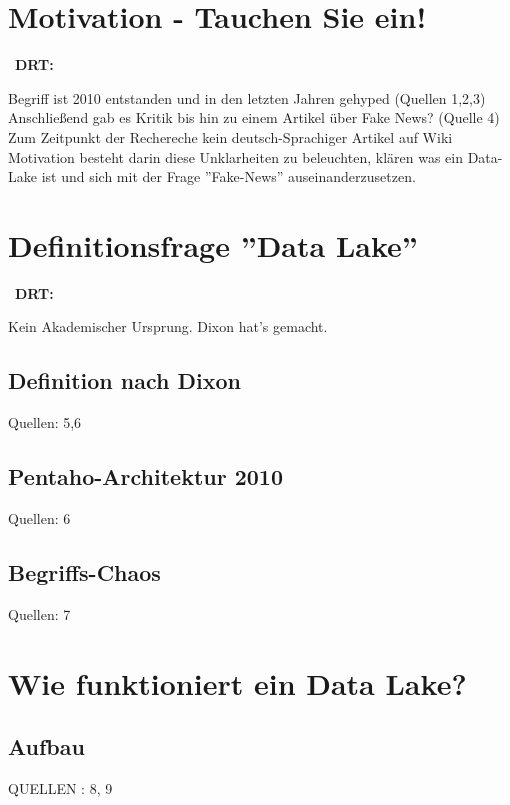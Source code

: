 \documentclass[
10pt, %
a4paper, %
oneside, %
headinclude,footinclude, %
BCOR5mm, %
]{scrartcl}
\begin{document}

\newpage %

\section{Motivation - Tauchen Sie ein!}\
\textbf{DRT:}

Begriff ist 2010 entstanden und in den letzten Jahren gehyped (Quellen 1,2,3)\\
Anschließend gab es Kritik bis hin zu einem Artikel über Fake News? (Quelle 4)\\
Zum Zeitpunkt der Rechereche kein deutsch-Sprachiger Artikel auf Wiki\\
Motivation besteht darin diese Unklarheiten zu beleuchten, klären was ein Data-Lake ist und sich mit der Frage ''Fake-News'' auseinanderzusetzen.


\section{Definitionsfrage ''Data Lake''}\
\textbf{DRT:}

Kein Akademischer Ursprung. Dixon hat's gemacht.
\subsection{Definition nach Dixon}
Quellen: 5,6
\subsection{Pentaho-Architektur 2010}
Quellen: 6
\subsection{Begriffs-Chaos}
Quellen: 7

\section{Wie funktioniert ein Data Lake?}
\subsection{Aufbau}
QUELLEN : 8, 9
\end{document}
